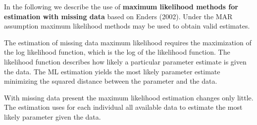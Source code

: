 In the following we describe the use of \textbf{maximum likelihood methods for estimation with missing data} based on Enders (2002). 
Under the MAR assumption maximum likelihood methods may be used to obtain valid estimates. \par
 The estimation of missing data maximum likelihood requires the maximization of the log likelihood function, which is the log of the likelihood function. The likelihood function describes how likely a particular parameter estimate is given the data. The ML estimation yields the most likely parameter estimate minimizing the squared distance between the parameter and the data. \par With missing data present the maximum likelihood estimation changes only little. The estimation uses for each individual all available data to estimate the most likely parameter given the data.
%
\endinput

